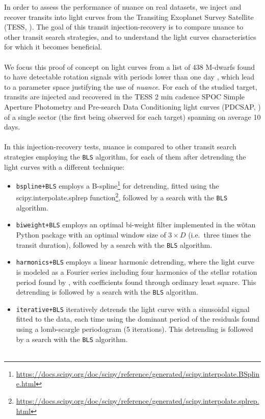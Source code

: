 \documentclass[modern]{aastex631}
\newcommand{\nuancemethod}{\textit{nuance}}
\newcommand{\nuance}{\nuancemethod{}}
\newcommand{\footlink}[1]{\footnote{\url{#1}}}
\begin{document}
In order to assess the performance of \textsf{nuance} on real datasets, we inject and recover transits into light curves from the Transiting Exoplanet Survey Satellite (TESS, \citealt{tess}). The goal of this transit injection-recovery is to compare \textsf{nuance} to other transit search strategies, and to understand the light curves characteristics for which it becomes beneficial.\\\\
We focus this proof of concept on light curves from a list of 438 M-dwarfs found to have detectable rotation signals with periods lower than one day \citep{Ramsay2020}, which lead to a parameter space justifying the use of \nuance{}. For each of the studied target, transits are injected and recovered in the TESS 2 min cadence SPOC Simple Aperture Photometry and Pre-search Data Conditioning light curves (PDCSAP, \citealt{spoc}) of a single sector (the first being observed for each target) spanning on average 10 days.\\\\
In this injection-recovery tests, \textsf{nuance} is compared to other transit search strategies employing the \texttt{BLS} algorithm, for each of them after detrending the light curves with a different technique:
\begin{itemize}
    \item \texttt{bspline+BLS} employs a B-spline\footlink{https://docs.scipy.org/doc/scipy/reference/generated/scipy.interpolate.BSpline.html} for detrending, fitted using the \textsf{scipy.interpolate.splrep} function\footlink{https://docs.scipy.org/doc/scipy/reference/generated/scipy.interpolate.splrep.html}, followed by a search with the \texttt{BLS} algorithm.
    \item \texttt{biweight+BLS} employs an optimal bi-weight filter implemented in the \textsf{wõtan} Python package \citep{wotan} with an optimal window size of $3\times D$ (i.e.\, three times the transit duration), followed by a search with the \texttt{BLS} algorithm.
    \item \texttt{harmonics+BLS} employs a linear harmonic detrending, where the light curve is modeled as a Fourier series including four harmonics of the stellar rotation period found by \cite{Ramsay2020}, with coefficients found through ordinary least square. This detrending is followed by a search with the \texttt{BLS} algorithm.
    \item \texttt{iterative+BLS} iteratively detrends the light curve with a sinusoidal signal fitted to the data, each time using the dominant period of the residuals found using a lomb-scargle periodogram (5 iterations). This detrending is followed by a search with the \texttt{BLS} algorithm.\\\\
\end{itemize}
\end{document}
